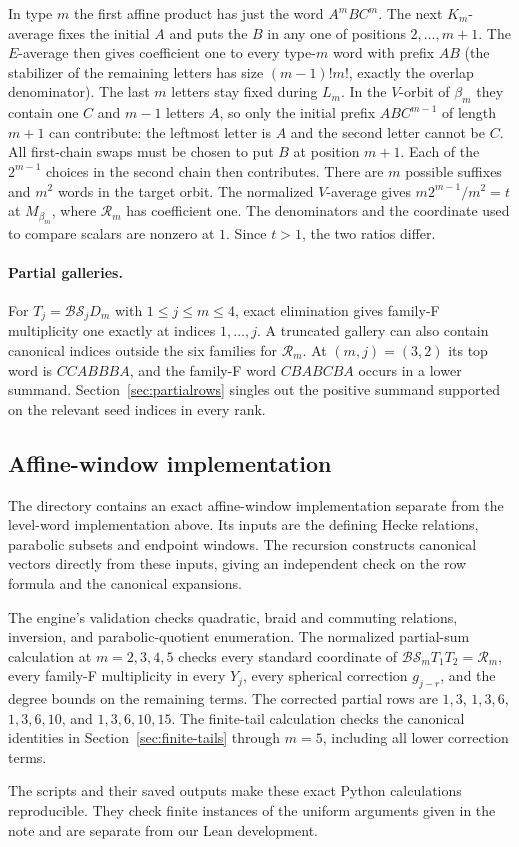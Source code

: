 In type $m$ the first affine product has just the word $A^mBC^m$.
The next $K_m$-average fixes the initial $A$ and puts the $B$ in any
one of positions $2,\ldots,m+1$. The $E$-average then gives coefficient
one to every type-$m$ word with prefix $AB$ (the stabilizer of the
remaining letters has size $(m-1)!m!$, exactly the overlap denominator).
The last $m$ letters stay fixed during $L_m$. In the $V$-orbit of
$\beta_m$ they contain one $C$ and $m-1$ letters $A$, so only
the initial prefix $ABC^{m-1}$ of length $m+1$ can contribute:
the leftmost letter is $A$ and the second letter cannot be $C$.
All first-chain swaps must be chosen to put $B$ at position $m+1$.
Each of the $2^{m-1}$ choices in the second chain then contributes.
There are $m$ possible suffixes and $m^2$ words in the target orbit.
The normalized $V$-average gives $m2^{m-1}/m^2=t$ at $M_{\beta_m}$,
where $\mathcal R_m$ has coefficient one. The denominators and the
coordinate used to compare scalars are nonzero at $1$. Since $t>1$,
the two ratios differ.

\paragraph{Partial galleries.}
For $T_j=\mathcal{BS}_jD_m$ with $1\le j\le m\le4$, exact
elimination gives family-F multiplicity one exactly at indices
$1,\ldots,j$. A truncated gallery can also contain canonical indices
outside the six families for $\mathcal R_m$. At $(m,j)=(3,2)$ its
top word is $CCABBBA$, and the family-F word $CBABCBA$ occurs in a lower
summand. Section~\ref{sec:partialrows} singles out the positive summand
supported on the relevant seed indices in every rank.


\subsection*{Affine-window implementation}
The directory  contains an exact
affine-window implementation separate from the level-word implementation
above. Its inputs are the defining Hecke relations, parabolic subsets and
endpoint windows. The recursion constructs canonical vectors directly
from these inputs, giving an independent check on the row formula and
the canonical expansions.

The engine's validation checks quadratic, braid and commuting relations,
inversion, and parabolic-quotient enumeration.
The normalized partial-sum calculation at \(m=2,3,4,5\) checks every
standard coordinate of \(\mathcal{BS}_mT_1T_2=\mathcal R_m\), every
family-F multiplicity in every \(Y_j\), every spherical correction
\(g_{j-r}\), and the degree bounds on the remaining terms.
The corrected partial rows are \(1,3\), \(1,3,6\), \(1,3,6,10\),
and \(1,3,6,10,15\).
The finite-tail calculation checks the canonical identities in
Section~\ref{sec:finite-tails} through \(m=5\), including all lower
correction terms.

The scripts and their saved outputs make these exact Python calculations
reproducible. They check finite instances of the uniform arguments given
in the note and are separate from our Lean development.
